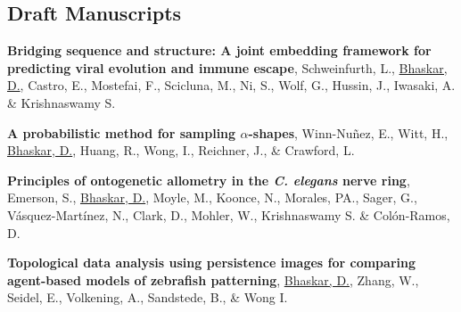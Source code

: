 \documentclass[margin,line]{res}
\begin{document}
\begin{resume}
\section{\sc Draft Manuscripts}
{
\renewcommand\leftmargini{0em}
\renewcommand{\labelenumi}{D\theenumi}
\begin{etaremune}[start=4]
\item{\bf Bridging sequence and structure: A joint embedding framework for predicting viral evolution and immune escape},
Schweinfurth, L., \underline{Bhaskar, D.}, Castro, E., Mostefai, F., Scicluna, M., Ni, S., Wolf, G., Hussin, J., Iwasaki, A. \& Krishnaswamy S.
\vspace*{.1cm}
\item{\bf A probabilistic method for sampling $\alpha$-shapes},
Winn-Nu\~{n}ez, E., Witt, H., \underline{Bhaskar, D.}, Huang, R., Wong, I., Reichner, J., \& Crawford, L.
\vspace*{.1cm}
\item{\bf Principles of ontogenetic allometry in the \textit{C. elegans} nerve ring},
Emerson, S., \underline{Bhaskar, D.}, Moyle, M., Koonce, N., Morales, PA., Sager, G., V\'{a}squez-Mart\'{i}nez, N., Clark, D., Mohler, W., Krishnaswamy S. \& Col\'{o}n-Ramos, D.
\vspace*{.1cm}
\item{\bf Topological data analysis using persistence images for comparing agent-based models of zebrafish patterning},
\underline{Bhaskar, D.}, Zhang, W., Seidel, E., Volkening, A., Sandstede, B., \& Wong I.
\end{etaremune}
}



\end{resume}
\end{document}
